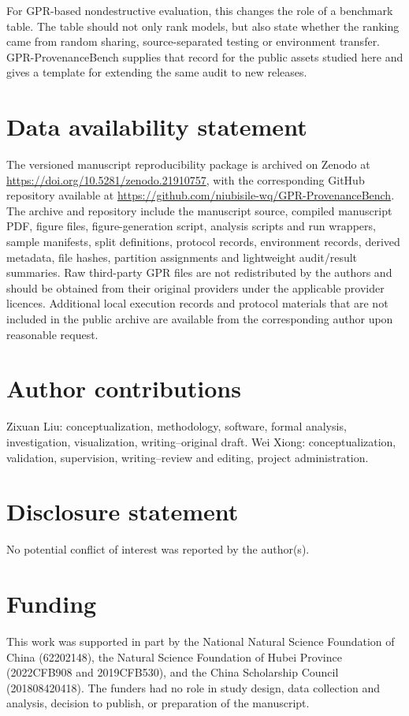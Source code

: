 \documentclass[]{interact}
\begin{document}
For GPR-based nondestructive evaluation, this changes the role of a benchmark table. The table should not only rank models, but also state whether the ranking came from random sharing, source-separated testing or environment transfer. GPR-ProvenanceBench supplies that record for the public assets studied here and gives a template for extending the same audit to new releases.

\section*{Data availability statement}

The versioned manuscript reproducibility package is archived on Zenodo at \url{https://doi.org/10.5281/zenodo.21910757}, with the corresponding GitHub repository available at \url{https://github.com/niubisile-wq/GPR-ProvenanceBench}. The archive and repository include the manuscript source, compiled manuscript PDF, figure files, figure-generation script, analysis scripts and run wrappers, sample manifests, split definitions, protocol records, environment records, derived metadata, file hashes, partition assignments and lightweight audit/result summaries. Raw third-party GPR files are not redistributed by the authors and should be obtained from their original providers under the applicable provider licences. Additional local execution records and protocol materials that are not included in the public archive are available from the corresponding author upon reasonable request.

\section*{Author contributions}

Zixuan Liu: conceptualization, methodology, software, formal analysis, investigation, visualization, writing--original draft. Wei Xiong: conceptualization, validation, supervision, writing--review and editing, project administration.

\section*{Disclosure statement}

No potential conflict of interest was reported by the author(s).

\section*{Funding}

This work was supported in part by the National Natural Science Foundation of China (62202148), the Natural Science Foundation of Hubei Province (2022CFB908 and 2019CFB530), and the China Scholarship Council (201808420418). The funders had no role in study design, data collection and analysis, decision to publish, or preparation of the manuscript.



\end{document}
